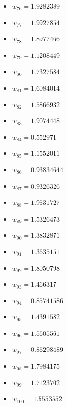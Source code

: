 \documentclass[11pt]{article}
\begin{document}
\begin{itemize}
\item $w_{76} = 1.9282389$
\item $w_{77} = 1.9927854$
\item $w_{78} = 1.8977466$
\item $w_{79} = 1.1208449$
\item $w_{80} = 1.7327584$
\item $w_{81} = 1.6084014$
\item $w_{82} = 1.5866932$
\item $w_{83} = 1.9074448$
\item $w_{84} = 0.552971$
\item $w_{85} = 1.1552011$
\item $w_{86} = 0.93834644$
\item $w_{87} = 0.9326326$
\item $w_{88} = 1.9531727$
\item $w_{89} = 1.5326473$
\item $w_{90} = 1.3832871$
\item $w_{91} = 1.3635151$
\item $w_{92} = 1.8050798$
\item $w_{93} = 1.466317$
\item $w_{94} = 0.85741586$
\item $w_{95} = 1.4391582$
\item $w_{96} = 1.5605561$
\item $w_{97} = 0.86298489$
\item $w_{98} = 1.7984175$
\item $w_{99} = 1.7123702$
\item $w_{100} = 1.5553552$
\end{itemize}
\end{document}
